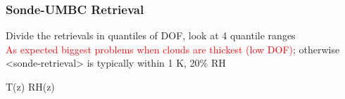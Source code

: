 \documentclass[10pt,t]{beamer}
\begin{document}
\begin{frame}
  \frametitle{Sonde-UMBC Retrieval}
  Divide the retrievals in quantiles of DOF, look at 4 quantile ranges\\
  \textcolor{red}{As expected biggest problems when clouds are thickest
    (low DOF)}; otherwise <sonde-retrieval> is typically within 1 K, 20\%
  RH

  \vspace{0.1in}
  T(z)  \hspace{3.0in} RH(z) \\
  \begin{center}
  \end{center}
\end{frame}
\end{document}
